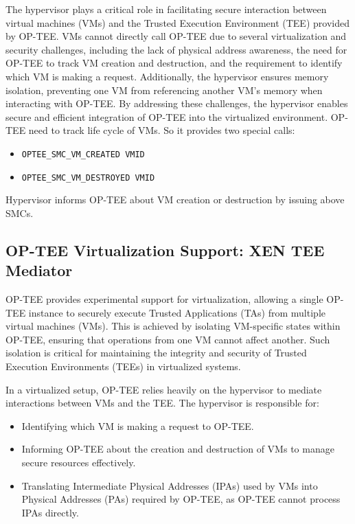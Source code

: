 \documentclass[acmtog]{acmart}
\begin{document}
The hypervisor plays a critical role in facilitating secure interaction between virtual machines (VMs) and the Trusted Execution Environment (TEE) provided by OP-TEE. VMs cannot directly call OP-TEE due to several virtualization and security challenges, including the lack of physical address awareness, the need for OP-TEE to track VM creation and destruction, and the requirement to identify which VM is making a request. Additionally, the hypervisor ensures memory isolation, preventing one VM from referencing another VM's memory when interacting with OP-TEE. By addressing these challenges, the hypervisor enables secure and efficient integration of OP-TEE into the virtualized environment. OP-TEE need to track life cycle of VMs. So it provides two special
calls: 
\begin{itemize}
  \item \texttt{OPTEE\_SMC\_VM\_CREATED VMID}
  \item \texttt{OPTEE\_SMC\_VM\_DESTROYED VMID}
\end{itemize}
Hypervisor informs OP-TEE about VM creation or destruction by issuing above SMCs.



\subsection{OP-TEE Virtualization Support: XEN TEE Mediator}

OP-TEE provides experimental support for virtualization, allowing a single OP-TEE instance to securely execute Trusted Applications (TAs) from multiple virtual machines (VMs). This is achieved by isolating VM-specific states within OP-TEE, ensuring that operations from one VM cannot affect another. Such isolation is critical for maintaining the integrity and security of Trusted Execution Environments (TEEs) in virtualized systems.

In a virtualized setup, OP-TEE relies heavily on the hypervisor to mediate interactions between VMs and the TEE. The hypervisor is responsible for:
\begin{itemize}
    \item Identifying which VM is making a request to OP-TEE.
    \item Informing OP-TEE about the creation and destruction of VMs to manage secure resources effectively.
    \item Translating Intermediate Physical Addresses (IPAs) used by VMs into Physical Addresses (PAs) required by OP-TEE, as OP-TEE cannot process IPAs directly.
\end{itemize}
\end{document}

